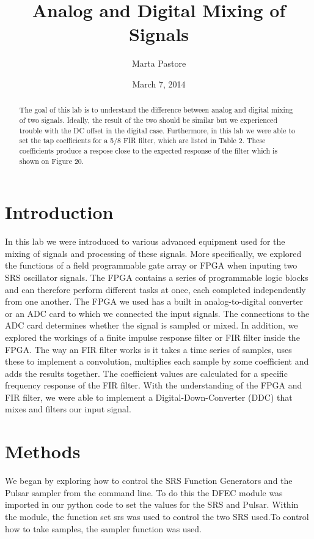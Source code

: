 \documentclass[12pt]{article}
\begin{document}
\title {Analog and Digital Mixing of Signals}
\author {Marta Pastore}
\date {March 7, 2014}
\maketitle

\begin {abstract}
The goal of this lab is to understand the difference between analog and
digital mixing of two signals. Ideally, the result of the two should be
similar but we experienced trouble with the DC offset in the digital
case. Furthermore, in this lab we were able to set the tap coefficients
for a 5/8 FIR filter, which are listed in Table 2. These coefficients
produce a respose close to the expected response of the filter which is
shown on Figure 20.

\end {abstract}

\section {Introduction}
In this lab we were introduced to various advanced equipment used for
the mixing of signals and processing of these signals. More
specifically, we explored the functions of a field programmable gate
array or FPGA when inputing two SRS oscillator signals. The FPGA
contains a series of programmable logic blocks and can therefore perform
different tasks at once, each completed independently from one
another. The FPGA we used has a built in analog-to-digital converter or
an ADC card to which we connected the input signals. The connections to
the ADC card determines whether the signal is sampled or mixed. In
addition, we explored the workings of a finite impulse response filter
or FIR filter inside the FPGA. The way an FIR filter works is it takes a
time series of samples, uses these to implement a convolution,
multiplies each sample by some coefficient and adds the results
together. The coefficient values are calculated for a specific frequency
response of the FIR filter. With the understanding of the FPGA and FIR
filter, we were able to implement a Digital-Down-Converter (DDC) that
mixes and filters our input signal.

\section {Methods}
We began by exploring how to control the SRS Function Generators and the
Pulsar sampler from the command line. To do this the DFEC module was
imported in our python code to set the values for the SRS and
Pulsar. Within the module, the function set srs was used to control the
two SRS used.To control how to take samples, the sampler function was
used.
\end{document}
